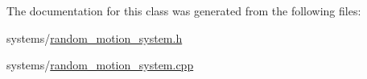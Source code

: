 The documentation for this class was generated from the following files\+:\begin{DoxyCompactItemize}
\item 
systems/\hyperlink{random__motion__system_8h}{random\+\_\+motion\+\_\+system.\+h}\item 
systems/\hyperlink{random__motion__system_8cpp}{random\+\_\+motion\+\_\+system.\+cpp}\end{DoxyCompactItemize}
